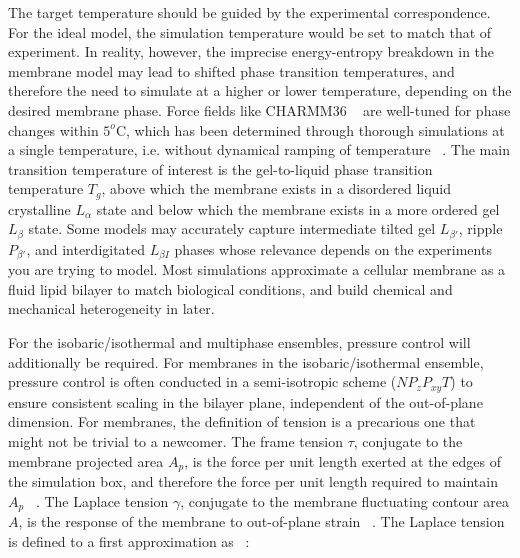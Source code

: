 \documentclass[9pt,bestpractices,pubversion]{livecoms}
\begin{document}
The target temperature should be guided by the experimental correspondence.
For the ideal model, the simulation temperature would be set to match that of experiment.
In reality, however, the imprecise energy-entropy breakdown in the membrane model may lead to shifted phase transition temperatures, and therefore the need to simulate at a higher or lower temperature, depending on the desired membrane phase.
Force fields like CHARMM36 ~\cite{Klauda2010d} are well-tuned for phase changes within $5^o$C, which has been determined through thorough simulations at a single temperature, i.e. without dynamical ramping of temperature ~\cite{Khakbaz2018}.
The main transition temperature of interest is the gel-to-liquid phase transition temperature $T_g$, above which the membrane exists in a disordered liquid crystalline $L_\alpha$ state and below which the membrane exists in a more ordered gel $L_\beta$ state.
Some models may accurately capture intermediate tilted gel $L_{\beta '}$, ripple $P_{\beta '}$, and interdigitated $L_{\beta I}$ phases whose relevance depends on the experiments you are trying to model.
Most simulations approximate a cellular membrane as a fluid lipid bilayer to match biological conditions, and build chemical and mechanical heterogeneity in later.

For the isobaric/isothermal and multiphase ensembles, pressure control will additionally be required.
For membranes in the isobaric/isothermal ensemble, pressure control is often conducted in a semi-isotropic scheme ($NP_{z}P_{xy}T$) to ensure consistent scaling in the bilayer plane, independent of the out-of-plane dimension.
For membranes, the definition of tension is a precarious one that might not be trivial to a newcomer.
The frame tension $\tau$, conjugate to the membrane projected area $A_p$, is the force per unit length exerted at the edges of the simulation box, and therefore the force per unit length required to maintain $A_p$ ~\cite{Diamant2011}.
The Laplace tension $\gamma$, conjugate to the membrane fluctuating contour area $A$, is the response of the membrane to out-of-plane strain ~\cite{Diamant2011}.
The Laplace tension is defined to a first approximation as ~\cite{Kirkwood1949}:
\end{document}

